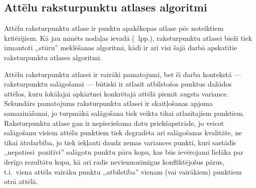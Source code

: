 \subsection{Attēlu raksturpunktu atlases algoritmi} \label{sec:corners}
Attēlu raksturpunktu atlase ir punktu apakškopas atlase pēc noteiktiem
kritērijiem. Kā jau minēts nodaļas ievadā (\pageref{sec:algo}~lpp.),
raksturpunktu atlasei bieži tiek izmantoti ,,stūru'' meklēšanas algoritmi,
kādi ir arī visi šajā darbā apskatītie raksturpunktu atlases algoritmi.

Attēlu raksturpunktu atlasei ir vairāki pamatojumi, bet šī darba kontekstā
--- raksturpunktu salāgošanai --- būtiski ir atlasīt atbilstošos punktus
dažādos attēlos, kuru lokālajai apkārtnei konkrētajā attēlā piemīt
augsta variance. Sekundārs pamatojums raksturpunktu atlasei ir
skaitļošanas apjoma samazināšanai, jo turpmākā salāgošana tiek veikta
tikai atlasītajiem punktiem. Raksturpunktu atlase gan ir nepieciešama
datu priekšapstrāde, jo veicot salāgošanu visiem attēlu punktiem tiek
degradēta arī salāgošanas kvalitāte, ne tikai ātrdarbība, jo tiek
iekļauti daudz zemas variances punkti, kuri sastādīs
,,nepatiesi~pozitīvi'' salāgotu punktu pāru kopu, kas būs ievērojami
lielāka par derīgo rezultātu kopu, kā arī radīs neviennozīmīgus
konfliktējošus pārus,
t.i.~viena attēla vairāku punktu ,,atbilstība'' vienam (vai vairākiem)
punktiem otrā attēlā.

